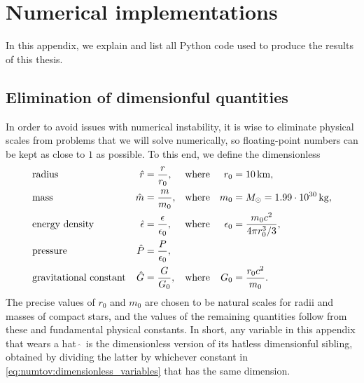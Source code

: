 
\chapter{Numerical implementations}
\label{chap:code}

In this appendix, we explain and list all Python code used to produce the results of this thesis.

\section{Elimination of dimensionful quantities}

In order to avoid issues with numerical instability, it is wise to eliminate physical scales from problems that we will solve numerically, so floating-point numbers can be kept as close to $1$ as possible.
To this end, we define the dimensionless
\begin{subequations}
\begin{align}
	& \text{radius}                 & \hat{r}        &= \frac{r}{r_0}               , & \text{where} && r_0        &= \SI{10}{\kilo\meter} , \\
	& \text{mass}                   & \hat{m}        &= \frac{m}{m_0}               , & \text{where} && m_0        &= M_\odot = \SI{1.99e30}{\kilogram} , \\
	& \text{energy density}         & \hat{\epsilon} &= \frac{\epsilon}{\epsilon_0} , & \text{where} && \epsilon_0 &= \frac{m_0 c^2}{4 \pi r_0^3 / 3} , \\
	& \text{pressure}               &  \hat{P}       &= \frac{P}{\epsilon_0}        , \\
	& \text{gravitational constant} & \hat{G}        &= \frac{G}{G_0}               , & \text{where} && G_0 &= \frac{r_0 c^2}{m_0} .
\end{align}%
\label{eq:numtov:dimensionless_variables}%
\end{subequations}%
The precise values of $r_0$ and $m_0$ are chosen to be natural scales for radii and masses of compact stars, and the values of the remaining quantities follow from these and fundamental physical constants.
In short, any variable in this appendix that wears a hat $\, \hat{} \, $ is the dimensionless version of its hatless dimensionful sibling, obtained by dividing the latter by whichever constant in \cref{eq:numtov:dimensionless_variables} that has the same dimension.

